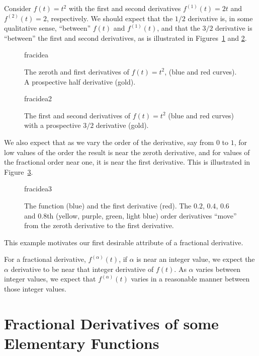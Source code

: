 \begin{example}
  Consider $f(t) = t^2$ with the first and second derivatives $f^{(1)}(t) = 2 t$
  and $f^{(2)}(t) = 2$, respectively. We should expect that the $1/2$ derivative
  is, in some qualitative sense, ``between'' $f(t)$ and $f^{(1)}(t)$, and that
  the $3/2$ derivative is ``between'' the first and second derivatives, as is
  illustrated in Figures~\ref{fig:fracidea1} and \ref{fig:fracidea2}.

  \begin{figure}
	\centering
	{fracidea}
	\caption{The zeroth and first derivatives of $f(t)=t^2$, (blue and red
	curves). A prospective half derivative (gold).}
	\label{fig:fracidea1}
  \end{figure}

  \begin{figure}
	\centering
	{fracidea2}
	\caption{The first and second derivatives of $f(t)=t^2$ (blue and red
	curves) with a prospective $3/2$ derivative (gold).}
	\label{fig:fracidea2}
  \end{figure}

  We also expect that as we vary the order of the derivative, say from $0$ to
  $1$, for low values of the order the result is near the zeroth derivative, and
  for values of the fractional order near one, it is near the first derivative.
  This is illustrated in Figure~\ref{fig:fracidea3}.

  \begin{figure}
	\centering
	{fracidea3}
	\caption{The function (blue) and the first derivative (red). The $0.2$,
	  $0.4$, $0.6$ and $0.8$th (yellow, purple, green, light blue) order
	derivatives ``move'' from the zeroth derivative to the first derivative.}
	\label{fig:fracidea3}
  \end{figure}
\end{example}

This example motivates our first desirable attribute of a fractional derivative.

\begin{attribute}
  For a fractional derivative, $f^{\left( \alpha \right)}(t)$, if $\alpha$ is near an integer value, we expect the $\alpha$ derivative to be near that integer derivative of $f(t)$. As $\alpha$ varies between integer values, we expect that $f^{\left( \alpha \right)}(t)$ varies in a reasonable manner between those integer values.
\end{attribute}

\section{Fractional Derivatives of some Elementary Functions}
